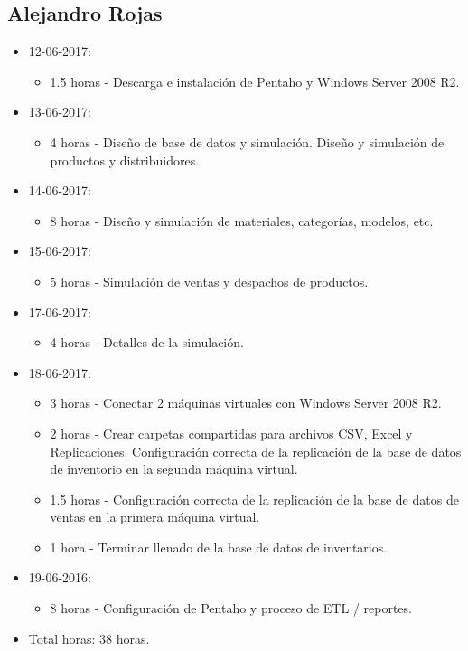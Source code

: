 \documentclass{article}
\begin{document}
\subsection{Alejandro Rojas}
\begin{itemize}
  \item 12-06-2017:
  \begin{itemize}
    \item 1.5 horas - Descarga e instalaci\'on de Pentaho y Windows Server 2008 R2.
  \end{itemize}
  \item 13-06-2017:
  \begin{itemize}
    \item 4 horas - Dise\~no de base de datos y simulaci\'on. Dise\~no y simulaci\'on de productos y distribuidores.
  \end{itemize}
  \item 14-06-2017:
  \begin{itemize}
    \item 8 horas - Dise\~no y simulaci\'on de materiales, categor\'ias, modelos, etc.
  \end{itemize}
  \item 15-06-2017:
  \begin{itemize}
    \item 5 horas - Simulaci\'on de ventas y despachos de productos.
  \end{itemize}
  \item 17-06-2017:
  \begin{itemize}
    \item 4 horas - Detalles de la simulaci\'on.
  \end{itemize}
  \item 18-06-2017:
  \begin{itemize}
    \item 3 horas - Conectar 2 m\'aquinas virtuales con Windows Server 2008 R2.
    \item 2 horas - Crear carpetas compartidas para archivos CSV, Excel y Replicaciones. Configuraci\'on correcta de la replicaci\'on de la base de datos de inventorio en la segunda m\'aquina virtual.
    \item 1.5 horas - Configuraci\'on correcta de la replicaci\'on de la base de datos de ventas en la primera m\'aquina virtual.
    \item 1 hora - Terminar llenado de la base de datos de inventarios.
  \end{itemize}
  \item 19-06-2016:
  \begin{itemize}
    \item 8 horas - Configuraci\'on de Pentaho y proceso de ETL / reportes.
  \end{itemize}
  \item Total horas: 38 horas.
\end{itemize}
\end{document}
